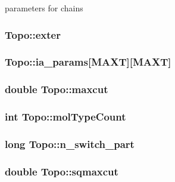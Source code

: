 parameters for chains 

\hypertarget{struct_topo_ac95b97650335d237d33f1da999db43ae}{
\subsubsection[{exter}]{ Topo\+::exter}}\label{struct_topo_ac95b97650335d237d33f1da999db43ae}
\hypertarget{struct_topo_a1e4ad27565a7c682ab00ad9791d06e71}{
\subsubsection[{ia\+\_\+params}]{ Topo\+::ia\+\_\+params\mbox{[}{\bf M\+A\+X\+T}\mbox{]}\mbox{[}{\bf M\+A\+X\+T}\mbox{]}}}\label{struct_topo_a1e4ad27565a7c682ab00ad9791d06e71}
\hypertarget{struct_topo_a5058af2ecbcdeb4282e1626198e28c42}{
\subsubsection[{maxcut}]{\setlength{\rightskip}{0pt plus 5cm}double Topo\+::maxcut}}\label{struct_topo_a5058af2ecbcdeb4282e1626198e28c42}
\hypertarget{struct_topo_a08924478d50743e66665a92a52110dd1}{
\subsubsection[{mol\+Type\+Count}]{\setlength{\rightskip}{0pt plus 5cm}int Topo\+::mol\+Type\+Count}}\label{struct_topo_a08924478d50743e66665a92a52110dd1}
\hypertarget{struct_topo_a2df8a376cf0d57fba8b5a2513aafcd40}{
\subsubsection[{n\+\_\+switch\+\_\+part}]{\setlength{\rightskip}{0pt plus 5cm}long Topo\+::n\+\_\+switch\+\_\+part}}\label{struct_topo_a2df8a376cf0d57fba8b5a2513aafcd40}
\hypertarget{struct_topo_a1f0ab42bb23e360ab07bb5439689b5f1}{
\subsubsection[{sqmaxcut}]{\setlength{\rightskip}{0pt plus 5cm}double Topo\+::sqmaxcut}}\label{struct_topo_a1f0ab42bb23e360ab07bb5439689b5f1}
